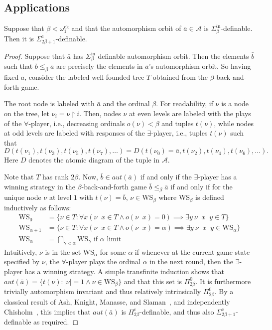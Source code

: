 \documentclass[10pt,a4paper]{amsart}
\newcommand\+[1]{\mathcal{#1}}
\renewcommand\*[1]{\mathbf{#1}}
\renewcommand\=[1]{\text{#1}}
\renewcommand\*[1]{\mathbf{#1}}
\newcommand{\A}{\mathcal{A}}
\newcommand{\Picom}[1]{\Pi^{\mathrm{c}}_{#1}}
\newcommand{\Sinf}[1]{\Sigma^{\mathrm{in}}_{#1}}
\newcommand{\Sicom}[1]{\Sigma^{\mathrm{c}}_{#1}}
\newcommand{\ba}{\bar a}
\newcommand{\ock}{\omega_{1}^{\mathrm{ck}}}
\DeclareMathOperator{\restrict}{\upharpoonright}
\DeclareMathOperator{\concat}{^\smallfrown}
\begin{document}
\subsection{Applications}\label{subsec:indexsetcalculations}
\begin{lemma}\label{lem:alphato2alpha}
  Suppose that $\beta < \ock$ and that the automorphism orbit of $\ba\in \A$ is $\Sinf{\beta}$-definable. Then it is $\Sicom{2\beta+1}$-definable.
\end{lemma}
\begin{proof}
 Suppose that $\bar a$ has $\Sinf{\beta}$ definable automorphism orbit. Then the elements $\bar b$ such that $\bar b\leq_\beta\bar a$ are precisely the elements in $\bar a$'s automorphism orbit. So having fixed $\bar a$, consider the labeled well-founded tree $T$ obtained from the $\beta$-back-and-forth game.

  The root node is labeled with $\bar a$ and the ordinal $\beta$. For readability, if $\nu$ is a node on the tree, let $\nu_i=\nu\restrict i$. Then, nodes $\nu$ at even levels are labeled with the plays of the $\forall$-player, i.e., decreasing ordinals $o(\nu)<\beta$ and tuples $t(\nu)$, while nodes at odd levels are labeled with responses of the $\exists$-player, i.e., tuples $t(\nu)$ such that
  \[
    D(t(\nu_1),t(\nu_3),t(\nu_5),t(\nu_7),\dots)=D(t(\nu_0)=\bar a,t(\nu_2),t(\nu_4),t(\nu_6), \dots).
  \]
  Here $D$ denotes the atomic diagram of the tuple in $\+A$.
  
  Note that $T$ has rank $2\beta$. 
  Now, $\bar b\in aut(\bar a)$ if and only if the $\exists$-player has a winning strategy in the $\beta$-back-and-forth game $\bar b\leq_\beta \bar a$ if and only if for the unique node $\nu$ at level $1$ with $t(\nu)=\bar b$, $\nu\in \mathrm{WS}_\beta$ where $\mathrm{WS}_\beta$ is defined inductively as follows:
  \begin{align*}
    \mathrm{WS}_0&=\{ \nu\in T: \forall x (\nu\concat x\in T \land o(\nu\concat x)=0)\implies \exists y\ \nu\concat x\concat y\in T\}\\
    \mathrm{WS}_{\alpha+1}&=\{ \nu\in T: \forall x (\nu\concat x\in T \land o(\nu\concat x)=\alpha)\implies \exists y\ \nu\concat x\concat y\in \mathrm{WS}_\alpha\}\\
    \mathrm{WS}_{\alpha}&=\bigcap_{\gamma<\alpha} \mathrm{WS}_\gamma \text{ if $\alpha$ limit}
  \end{align*}
  Intuitively, $\nu$ is in the set $\mathrm{WS}_{\alpha}$ for some $\alpha$ if whenever at the current game state specified by $\nu$, the $\forall$-player plays the ordinal $\alpha$ in the next round, then the $\exists$-player has a winning strategy.
  A simple transfinite induction shows that $aut(\bar a)=\{t(\nu): |\nu|=1\land \nu\in \mathrm{WS}_\beta\}$ and that this set is $\Pi^0_{2\beta}$. It is furthermore trivially automorphism invariant and thus relatively intrinsically $\Pi^0_{2\beta}$. By a classical result of Ash, Knight, Manasse, and Slaman~\cite{ash1989}, and independently Chisholm~\cite{chisholm1990}, this implies that $aut(\bar a)$ is $\Picom{2\beta}$-definable, and thus also $\Sicom{2\beta+1}$-definable as required.
\end{proof}
\end{document}

